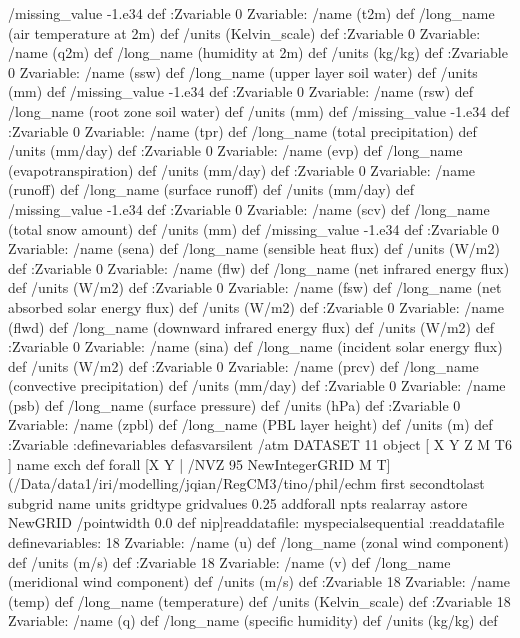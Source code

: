 \begin{ingrid}
{/missing_value -1.e34 def
:Zvariable
0 Zvariable: /name (t2m) def /long_name (air temperature at 2m)  def /units (Kelvin_scale) def
:Zvariable
0 Zvariable: /name (q2m) def /long_name (humidity at 2m)  def /units (kg/kg) def
:Zvariable
0 Zvariable: /name (ssw) def /long_name (upper layer soil water)  def /units (mm) def
/missing_value -1.e34 def
:Zvariable
0 Zvariable: /name (rsw) def /long_name (root zone soil water)  def /units (mm) def
/missing_value -1.e34 def
:Zvariable
0 Zvariable: /name (tpr) def /long_name (total precipitation)  def /units (mm/day) def
:Zvariable
0 Zvariable: /name (evp) def /long_name (evapotranspiration)  def /units (mm/day) def
:Zvariable
0 Zvariable: /name (runoff) def /long_name (surface runoff)  def /units (mm/day) def
/missing_value -1.e34 def
:Zvariable
0 Zvariable: /name (scv) def /long_name (total snow amount)  def /units (mm) def
/missing_value -1.e34 def
:Zvariable
0 Zvariable: /name (sena) def /long_name (sensible heat flux)  def /units (W/m2) def
:Zvariable
0 Zvariable: /name (flw) def /long_name (net infrared energy flux)  def /units (W/m2) def
:Zvariable
0 Zvariable: /name (fsw) def /long_name (net absorbed solar energy flux)  def /units (W/m2) def
:Zvariable
0 Zvariable: /name (flwd) def /long_name (downward infrared energy flux)  def /units (W/m2) def
:Zvariable
0 Zvariable: /name (sina) def /long_name (incident solar energy flux)  def /units (W/m2) def
:Zvariable
0 Zvariable: /name (prcv) def /long_name (convective precipitation)  def /units (mm/day) def
:Zvariable
0 Zvariable: /name (psb) def /long_name (surface pressure)  def /units (hPa) def
:Zvariable
0 Zvariable: /name (zpbl) def /long_name (PBL layer height)  def /units (m) def
:Zvariable
:definevariables
} defasvarsilent
/atm
{
DATASET 11 object
[ X Y Z M T6 ] {  name exch def } forall
[X
    Y | 
/NVZ 95 NewIntegerGRID
    M T] (/Data/data1/iri/modelling/jqian/RegCM3/tino/phil/echm%
        first secondtolast subgrid
        name units gridtype gridvalues
            {0.25 add}forall npts realarray astore
            NewGRID
         /pointwidth 0.0 def
         nip]readdatafile: 
myspecialsequential
:readdatafile
definevariables:
18 Zvariable: /name (u) def /long_name (zonal wind component) def /units (m/s) def
:Zvariable
18 Zvariable: /name (v) def /long_name (meridional wind component) def /units (m/s) def
:Zvariable
18 Zvariable: /name (temp) def /long_name (temperature) def /units (Kelvin_scale) def
:Zvariable
18 Zvariable: /name (q) def /long_name (specific humidity) def /units (kg/kg) def
}
\end{ingrid}
